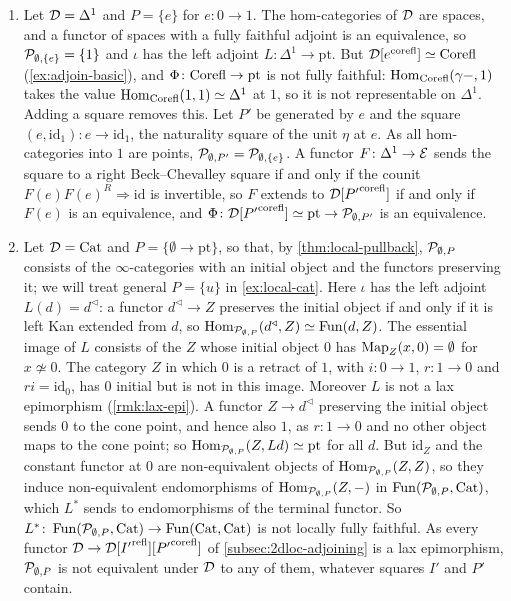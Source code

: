 \begin{exmp}
\label{ex:local-vs-pushout}
%
\leavevmode
\begin{enumerate}
\item Let $\mathcal{D} = \Delta^{1}$ and $P = \{e\}$ for $e\colon 0 \to 1$.
The hom-categories of $\mathcal{D}$ are spaces, and a functor of spaces with a fully
faithful adjoint is an equivalence, so
$\mathcal{P}_{\emptyset,\{e\}} = \{1\}$
and $\iota$ has the left adjoint
$L\colon \Delta^{1} \to \mathrm{pt}$.
But
$\mathcal{D}[{e}^{\mathrm{corefl}}] \simeq \mathrm{Corefl}$
(\cref{ex:adjoin-basic}), and
$\Phi\colon \mathrm{Corefl} \to \mathrm{pt}$
is not fully faithful:
$\operatorname{Hom}_{\mathrm{Corefl}}(\gamma-,1)$
takes the value
$\operatorname{Hom}_{\mathrm{Corefl}}(1,1) \simeq \Delta^{1}$
at $1$, so it is not representable on $\Delta^{1}$.
Adding a square removes this. Let $P'$ be generated by $e$ and the square
$(e,\mathrm{id}_{1})\colon e \to \mathrm{id}_{1}$,
the naturality square of the unit $\eta$ at $e$.
As all hom-categories into $1$ are points,
$\mathcal{P}_{\emptyset,P'} = \mathcal{P}_{\emptyset,\{e\}}$.
A functor
$F\colon \Delta^{1} \to \mathcal{E}$
sends the square to a right Beck--Chevalley square if and only if the counit
$F(e)F(e)^{R} \Rightarrow \mathrm{id}$
is invertible, so $F$ extends to $\mathcal{D}[{P'}^{\mathrm{corefl}}]$ if and only if $F(e)$ is an
equivalence, and
$\Phi\colon \mathcal{D}[{P'}^{\mathrm{corefl}}] \simeq \mathrm{pt} \to \mathcal{P}_{\emptyset,P'}$
is an equivalence.
\item Let $\mathcal{D} = \mathrm{Cat}$ and
$P = \{\emptyset \to \mathrm{pt}\}$,
so that, by \cref{thm:local-pullback}, $\mathcal{P}_{\emptyset,P}$ consists of the
$\infty$-categories with an initial object and the functors preserving it;
we will treat general $P = \{u\}$ in \cref{ex:local-cat}.
Here $\iota$ has the left adjoint
$L(d) = d^{\triangleleft}$:
a functor
$d^{\triangleleft} \to Z$
preserves the initial object if and only if it is left Kan extended from $d$, so
$\operatorname{Hom}_{\mathcal{P}_{\emptyset,P}}(d^{\triangleleft},Z) \simeq \operatorname{Fun}(d,Z)$.
The essential image of $L$ consists of the $Z$ whose initial object $0$ has
$\operatorname{Map}_{Z}(x,0) = \emptyset$
for $x \not\simeq 0$. The category $Z$ in which $0$ is a retract of $1$,
with $i\colon 0 \to 1$, $r\colon 1 \to 0$ and $ri = \mathrm{id}_{0}$,
has $0$ initial but is not in this image.
Moreover $L$ is not a lax epimorphism (\cref{rmk:lax-epi}). A functor
$Z \to d^{\triangleleft}$
preserving the initial object sends $0$ to the cone point, and hence also $1$,
as $r\colon 1 \to 0$ and no other object maps to the cone point; so
$\operatorname{Hom}_{\mathcal{P}_{\emptyset,P}}(Z,Ld) \simeq \mathrm{pt}$
for all $d$. But $\mathrm{id}_{Z}$ and the constant functor at $0$ are
non-equivalent objects of
$\operatorname{Hom}_{\mathcal{P}_{\emptyset,P}}(Z,Z)$,
so they induce non-equivalent endomorphisms of
$\operatorname{Hom}_{\mathcal{P}_{\emptyset,P}}(Z,-)$
in
$\operatorname{Fun}(\mathcal{P}_{\emptyset,P},\mathrm{Cat})$,
which $L^{*}$ sends to endomorphisms of the terminal functor. So
$L^{*}\colon \operatorname{Fun}(\mathcal{P}_{\emptyset,P},\mathrm{Cat}) \to \operatorname{Fun}(\mathrm{Cat},\mathrm{Cat})$
is not locally fully faithful. As every functor
$\mathcal{D} \to \mathcal{D}[{I'}^{\mathrm{refl}}][{P'}^{\mathrm{corefl}}]$
of \cref{subsec:2dloc-adjoining} is a lax epimorphism,
$\mathcal{P}_{\emptyset,P}$ is not equivalent under $\mathcal{D}$ to any of them,
whatever squares $I'$ and $P'$ contain.
\end{enumerate}
\end{exmp}

